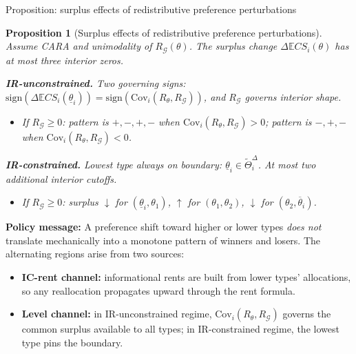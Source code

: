 \documentclass[10pt, aspectratio=169]{beamer}
\newcommand{\E}{\mathbb{E}}
\newcommand{\G}{\mathcal{G}}
\newcommand{\Cov}{\mathrm{Cov}}
\newcommand{\sign}{\mathrm{sign}}
\newtheorem{proposition}{Proposition}
\begin{document}
\begin{frame}{Proposition: surplus effects of redistributive preference perturbations}
\begin{proposition}[Surplus effects of redistributive preference perturbations]
Assume CARA and unimodality of $R_\G(\theta)$. The surplus change $\Delta\E CS_i(\theta)$ has at most three interior zeros.

\textbf{IR-unconstrained.} Two governing signs: $\sign(\Delta\E CS_i(\underline\theta_i)) = \sign(\Cov_i(R_\theta, R_\G))$, and $R_\G$ governs interior shape.
\begin{itemize}
\item If $R_\G \geq 0$: pattern is $+,-,+,-$ when $\Cov_i(R_\theta, R_\G) > 0$; pattern is $-,+,-$ when $\Cov_i(R_\theta, R_\G) < 0$.
\end{itemize}

\textbf{IR-constrained.} Lowest type always on boundary: $\underline\theta_i \in \tilde\Theta_i^\Delta$. At most two additional interior cutoffs.
\begin{itemize}
\item If $R_\G \geq 0$: surplus $\downarrow$ for $(\underline\theta_i, \theta_1)$, $\uparrow$ for $(\theta_1, \theta_2)$, $\downarrow$ for $(\theta_2, \overline\theta_i)$.
\end{itemize}
\end{proposition}
\vspace{0.1cm}
\textbf{Policy message:} A preference shift toward higher or lower types \emph{does not} translate mechanically into a monotone pattern of winners and losers. The alternating regions arise from two sources:
\begin{itemize}
\item \textbf{IC-rent channel:} informational rents are built from lower types' allocations, so any reallocation propagates upward through the rent formula.
\item \textbf{Level channel:} in IR-unconstrained regime, $\Cov_i(R_\theta, R_\G)$ governs the common surplus available to all types; in IR-constrained regime, the lowest type pins the boundary.
\end{itemize}
\end{frame}
\end{document}
